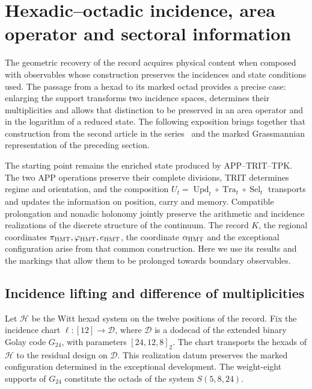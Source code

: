 \section{Hexadic--octadic incidence, area operator and sectoral information}
\label{rev4:ae:seccion}

The geometric recovery of the record acquires physical content when
composed with observables whose construction preserves the incidences and
state conditions used. The passage from a hexad to its marked octad
provides a precise case: enlarging the support transforms two
incidence spaces, determines their multiplicities and allows
that distinction to be preserved in an area operator and in the logarithm of a
reduced state. The following exposition brings together that construction from the second
article in the series~\cite{hmtII} and the marked Grassmannian
representation of the preceding section.

The starting point remains the enriched state produced by
APP--TRIT--TPK. The two APP operations preserve their complete
divisions, TRIT determines regime and orientation, and the composition
\(U_t=\operatorname{Upd}_t\circ\operatorname{Tra}_t\circ
\operatorname{Sel}_t\) transports and updates the information on position,
carry and memory. Compatible prolongation and nonadic holonomy
jointly preserve the arithmetic and incidence realizations of the
discrete structure of the continuum. The record \(K\), the regional
coordinates \(\pi_{\rm HMT},\varphi_{\rm HMT},e_{\rm HMT}\), the
coordinate \(\alpha_{\rm HMT}\) and the exceptional configuration arise
from that common construction. Here we use its results and the markings
that allow them to be prolonged towards boundary observables.

\subsection{Incidence lifting and difference of multiplicities}

Let \(\mathcal H\) be the Witt hexad system on the twelve positions
of the record. Fix the incidence chart \(\ell:[12]\to\mathscr D\),
where \(\mathscr D\) is a dodecad of the extended binary Golay code
\(G_{24}\), with parameters \([24,12,8]_2\). The chart transports the
hexads of \(\mathcal H\) to the residual design on \(\mathscr D\).
This realization datum preserves the marked configuration determined
in the exceptional development. The weight-eight supports of \(G_{24}\)
constitute the octads of the system \(S(5,8,24)\).

